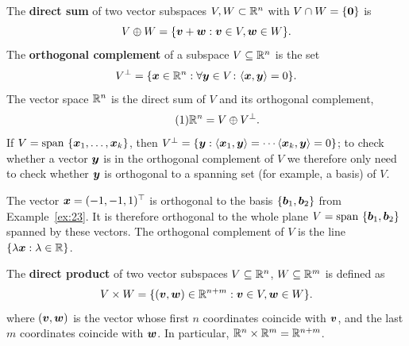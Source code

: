 \documentclass[11pt,a4paper]{memoir}
\begin{document}
The \textbf{direct sum} of two vector subspaces $V,W\subset \mathbb{R}^n$ with $V\cap W=\{\bm{0}\}$ is
\begin{equation*}
 V\oplus W = \{\bm{v}+\bm{w} \mathrel{\mathop{:}} \bm{v}\in V, \bm{w}\in W\}.
\end{equation*}
The \strictpagecheck{}\textbf{orthogonal complement} of a subspace $V\subseteq \mathbb{R}^n$ is the set 
\begin{equation*}
 V^{\perp}=\{\bm{x}\in \mathbb{R}^n\mathrel{\mathop{:}} \forall \bm{y}\in V\colon \langle {\bm{x}}, {\bm{y}} \rangle=0\}. 
\end{equation*}
The vector space $\mathbb{R}^n$ is the direct sum of $V$ and its orthogonal complement,
\begin{equation}\label{eq:orthocomp}\tag{1}
\mathbb{R}^n = V\oplus V^{\perp}.
\end{equation}
If $V=\mathrm{span}\ \{\vct{x}_1,\dots,\vct{x}_k\}$, then $V^{\perp}=\{\bm{y}\mathrel{\mathop{:}} \langle {\bm{x}_1}, {\bm{y}} \rangle=\cdots \langle {\bm{x}_k}, {\bm{y}} \rangle=0\}$; to check whether a vector $\bm{y}$ is in the orthogonal complement of $V$ we therefore only need to check whether $\bm{y}$ is orthogonal to a spanning set (for example, a basis) of $V$.

\begin{example}
The vector $\bm{x}=(-1,-1,1)^{\top}$ is orthogonal to the basis $\{\bm{b}_1,\bm{b}_2\}$ from Example~\ref{ex:23}. It is therefore orthogonal to the whole plane $V=\mathrm{span} \ \{\vct{b}_1,\vct{b}_2\}$ spanned by these vectors. The orthogonal complement of $V$ is the line $\{\lambda \bm{x}\mathrel{\mathop{:}} \lambda\in \mathbb{R}\}$.
\end{example}

The \textbf{direct product} of two vector subspaces $V\subseteq \mathbb{R}^n$, $W\subseteq \mathbb{R}^m$ is defined as
\begin{equation*}
 V\times W = \{(\bm{v},\bm{w})\in \mathbb{R}^{n+m} \mathrel{\mathop{:}} \bm{v}\in V, \bm{w}\in W\}.
\end{equation*}
where $(\bm{v},\bm{w})$ is the vector whose first $n$ coordinates coincide with $\bm{v}$, and the last $m$ coordinates coincide with $\bm{w}$. In particular, $\mathbb{R}^{n}\times \mathbb{R}^m = \mathbb{R}^{n+m}$.
\end{document}
